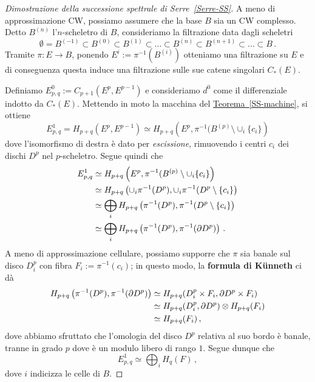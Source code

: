 	
	\begin{proof}[Dimostrazione della successione spettrale di Serre~\ref{Serre-SS}]
		A meno di approssimazione CW, possiamo assumere che la base $B$
		sia un CW complesso. Detto $B^{(n)}$ l'$n$-scheletro di $B$,
		consideriamo la filtrazione data dagli scheletri
		\begin{equation*}
			\emptyset = B^{(-1)} \subset B^{(0)} \subset B^{(1)} \subset \dots
			\subset B^{(n)} \subset B^{(n+1)} \subset \dots \subset B\,.
		\end{equation*}
		Tramite $\pi : E \to B$, 
		ponendo $E^{i} := \pi^{-1}\left(B^{(i)}\right)$
		otteniamo una filtrazione su $E$ e di conseguenza
		questa induce una filtrazione sulle sue catene singolari $C_{*}(E)$.
		
		Definiamo $E^{0}_{p,q} := C_{p+1}\left( E^{p}, E^{p-1} \right)$
		e consideriamo $d^{0}$ come il differenziale indotto da
		$C_{*}(E)$. Mettendo in moto la macchina del
		\hyperref[SS-machine]{Teorema~\ref{SS-machine}}, si ottiene
		\begin{equation*}
			E^{1}_{p,q} = H_{p+q}\left( E^{p}, E^{p-1} \right)
			\simeq H_{p+q}\left( E^{p}, \pi^{-1}(B^{(p)} \setminus \cup_{i}\{c_{i}\} \right)
		\end{equation*}
		dove l'isomorfismo di destra è dato per \emph{escissione},
		rimuovendo i centri $c_{i}$ dei dischi $D^{p}$ nel $p$-scheletro.
		Segue quindi che
		\begin{align*}
			E^{1}_{p,q} &\simeq H_{p+q}\left( E^{p}, \pi^{-1}(B^{(p)} \setminus \cup_{i}\{c_{i}\} \right) \\
			&\simeq H_{p+q}\left( \cup_{i} \pi^{-1}(D^{p}), \cup_{i} \pi^{-1}(D^{p} \setminus \{c_{i}\} \right) \\
			&\simeq \bigoplus_{i} H_{p+q}\left( \pi^{-1}(D^{p}), \pi^{-1}(D^{p} \setminus \{c_{i}\} \right) \\
			&\simeq \bigoplus_{i} H_{p+q}\left( \pi^{-1}(D^{p}), \pi^{-1}(\partial D^{p}) \right) \,.
		\end{align*}
		A meno di approssimazione cellulare,
		possiamo supporre che $\pi$ sia banale sul disco $D_{i}^{p}$
		con fibra $F_{i}:= \pi^{-1}(c_{i})$; in questo modo,
		la \textbf{formula di Künneth} ci dà
		\begin{align*}
			H_{p+q}\left( \pi^{-1}(D^{p}), \pi^{-1}(\partial D^{p}) \right)
			&\simeq H_{p+q}(D_{i}^{p} \times F_{i}, \partial D^{p} \times F_{i}) \\
			&\simeq H_{p+q}(D_{i}^{p}, \partial D^{p}) \otimes H_{p+q}(F_{i}) \\
			&\simeq H_{p+q}(F_{i})\,,
		\end{align*}
		dove abbiamo sfruttato che l'omologia del disco $D^{p}$
		relativa al suo bordo è banale, tranne in grado $p$
		dove è un modulo libero di rango $1$.
		Segue dunque che
		\begin{equation*}
			E^{1}_{p,q} \simeq \bigoplus_{i} H_{q}(F)\,, 
		\end{equation*}
		dove $i$ indicizza le celle di $B$.
		

\end{proof}
